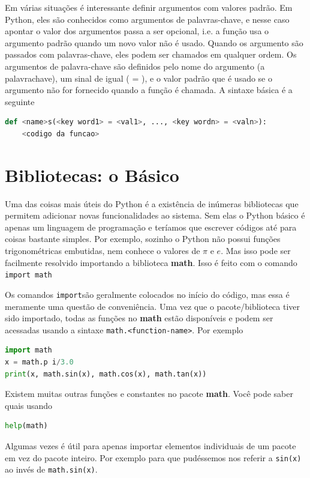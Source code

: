 Em várias situações é interessante definir argumentos com valores padrão. Em Python, eles são conhecidos como argumentos de palavras-chave, e nesse caso apontar o valor dos argumentos passa a ser opcional, i.e. a função usa o argumento padrão quando um novo valor não é usado. Quando os argumento são passados com palavras-chave, eles podem ser chamados em qualquer ordem. Os argumentos de palavra-chave são definidos pelo nome do argumento (a palavrachave), um sinal de igual ( = ), e o valor padrão que é usado se o argumento não for fornecido quando a função é chamada. A sintaxe básica é a seguinte
\begin{lstlisting}[language=Python]
def <name>s(<key word1> = <val1>, ..., <key wordn> = <valn>):
    <codigo da funcao>
\end{lstlisting}




\section{Bibliotecas: o Básico}

Uma das coisas mais úteis do Python é a existência de inúmeras bibliotecas que permitem adicionar novas funcionalidades ao sistema. Sem elas o Python básico é apenas um linguagem de programação e teríamos que escrever códigos até para coisas bastante simples. Por exemplo, sozinho o Python não possui funções trigonométricas embutidas, nem conhece o valores de $\pi$ e $e$. Mas isso pode ser facilmente resolvido importando a biblioteca {\bf math}. Isso é feito com o comando {\tt import math}

Os comandos {\tt import}são geralmente colocados no início do código, mas essa é meramente uma questão de conveniência. Uma vez que o pacote/biblioteca tiver sido importado, todas as funções no {\bf math} estão disponíveis e podem ser acessadas usando a sintaxe {\tt math.<function-name>}. Por exemplo

\begin{lstlisting}[language=Python]
import math
x = math.p i/3.0
print(x, math.sin(x), math.cos(x), math.tan(x))
\end{lstlisting}

Existem muitas outras funções e constantes no pacote {\bf math}. Você pode saber quais usando 

\begin{lstlisting}[language=Python]
help(math)
\end{lstlisting}

Algumas vezes é
 útil para apenas importar elementos individuais de um pacote em vez do pacote inteiro. Por exemplo para que pudéssemos nos referir a {\tt sin(x)} ao invés de {\tt math.sin(x)}.
 

